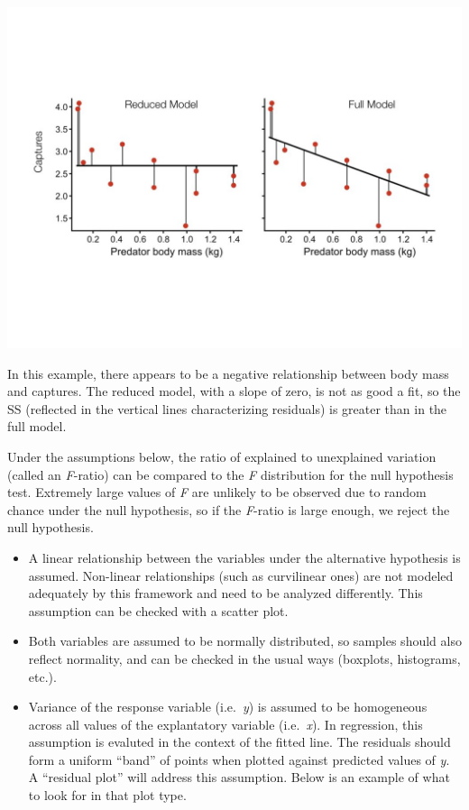 \documentclass[
]{book}
\begin{document}
\begin{center}\includegraphics[width=14.22in]{images/images_4b.011} \end{center}

In this example, there appears to be a negative relationship between body mass and captures. The reduced model, with a slope of zero, is not as good a fit, so the SS (reflected in the vertical lines characterizing residuals) is greater than in the full model.

Under the assumptions below, the ratio of explained to unexplained variation (called an \emph{F}-ratio) can be compared to the \emph{F} distribution for the null hypothesis test. Extremely large values of \emph{F} are unlikely to be observed due to random chance under the null hypothesis, so if the \emph{F}-ratio is large enough, we reject the null hypothesis.

\begin{itemize}
\item
  A linear relationship between the variables under the alternative hypothesis is assumed. Non-linear relationships (such as curvilinear ones) are not modeled adequately by this framework and need to be analyzed differently. This assumption can be checked with a scatter plot.
\item
  Both variables are assumed to be normally distributed, so samples should also reflect normality, and can be checked in the usual ways (boxplots, histograms, etc.).
\item
  Variance of the response variable (i.e.~\emph{y}) is assumed to be homogeneous across all values of the explantatory variable (i.e.~\emph{x}). In regression, this assumption is evaluted in the context of the fitted line. The residuals should form a uniform ``band'' of points when plotted against predicted values of \emph{y}. A ``residual plot'' will address this assumption. Below is an example of what to look for in that plot type.
\end{itemize}
\end{document}
